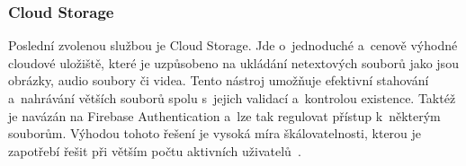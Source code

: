 \hypertarget{cloud-storage}{%
\subsubsection{Cloud Storage}\label{cloud-storage}}

Poslední zvolenou službou je Cloud Storage. Jde o~jednoduché a~cenově výhodné cloudové uložiště, které je uzpůsobeno na ukládání netextových souborů jako jsou obrázky, audio soubory či videa. Tento nástroj umožňuje efektivní stahování a~nahrávání větších souborů spolu s~jejich validací a~kontrolou existence. Taktéž je navázán na Firebase Authentication a~lze tak regulovat přístup k~některým souborům. Výhodou tohoto řešení je vysoká míra škálovatelnosti, kterou je zapotřebí řešit při větším počtu aktivních uživatelů~\parencite{storage}.
